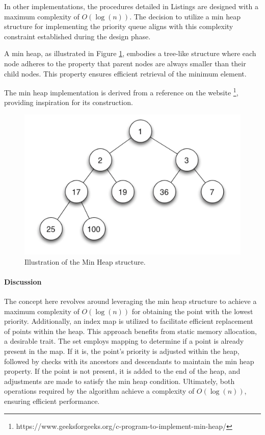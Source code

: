 In other implementations, the procedures detailed in Listings  are designed with a maximum complexity of $O(\log(n))$. The decision to utilize a min heap structure for implementing the priority queue aligns with this complexity constraint established during the design phase.

A min heap, as illustrated in Figure \ref{fig:min_heap}, embodies a tree-like structure where each node adheres to the property that parent nodes are always smaller than their child nodes. This property ensures efficient retrieval of the minimum element.

The min heap implementation is derived from a reference on the website \footnote{https://www.geeksforgeeks.org/c-program-to-implement-min-heap/}, providing inspiration for its construction.


\begin{figure}[!h]
\centering
\includegraphics[width=1\linewidth]{figures/tree.jpeg}
\caption{Illustration of the Min Heap structure.}
\label{fig:min_heap}
\end{figure}


\paragraph{Discussion}

The concept here revolves around leveraging the min heap structure to achieve a maximum complexity of $O(\log(n))$ for obtaining the point with the lowest priority. Additionally, an index map is utilized to facilitate efficient replacement of points within the heap. This approach benefits from static memory allocation, a desirable trait.
The set employs mapping to determine if a point is already present in the map. If it is, the point's priority is adjusted within the heap, followed by checks with its ancestors and descendants to maintain the min heap property. If the point is not present, it is added to the end of the heap, and adjustments are made to satisfy the min heap condition.
Ultimately, both operations required by the algorithm achieve a complexity of $O(\log(n))$, ensuring efficient performance.

